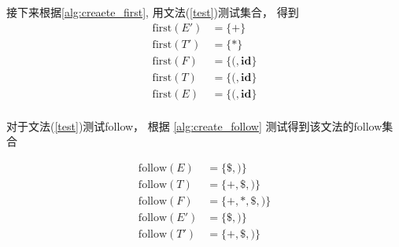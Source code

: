 \documentclass[../report]{subfiles}
\begin{document}
接下来根据\cref{alg:creaete_first},
用文法(\ref{test})测试集合，
得到
\begin{equation}
  \begin{array}{ll}
    \mathrm{first}(E') &= \{+\} \\
    \mathrm{first}(T') &= \{*\} \\
    \mathrm{first}(F) &= \{(, \textbf{id}\} \\
    \mathrm{first}(T) &= \{(, \textbf{id}\} \\
    \mathrm{first}(E) &= \{(, \textbf{id}\} \\
  \end{array}
  \label{eq:first_ans}
\end{equation}

对于文法(\ref{test})测试follow，
根据
\cref{alg:create_follow}
测试得到该文法的follow集合

\begin{equation}
  \begin{array}{ll}
  	\mathrm{follow}(E) &= \{\$, )\} \\
  	\mathrm{follow}(T) &= \{+, \$, )\} \\
  	\mathrm{follow}(F) &= \{+, *, \$, )\} \\
  	\mathrm{follow}(E') &= \{\$, )\} \\
  	\mathrm{follow}(T') &= \{+, \$, )\} \\
  \end{array}
  \label{eq:follow_ans}
\end{equation}
\end{document}
